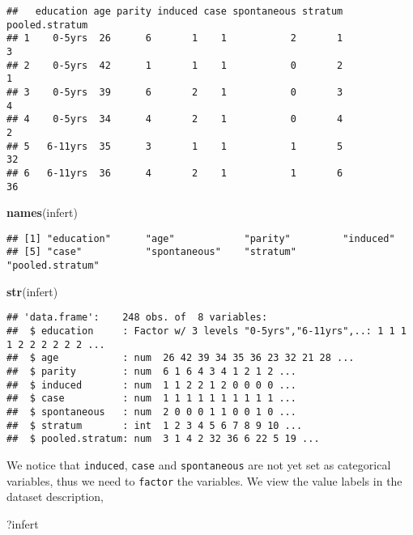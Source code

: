 \documentclass[]{book}
\newenvironment{Shaded}{\begin{snugshade}}{\end{snugshade}}
\newcommand{\KeywordTok}[1]{\textcolor[rgb]{0.13,0.29,0.53}{\textbf{{#1}}}}
\newcommand{\NormalTok}[1]{{#1}}
\theoremstyle{definition}
\theoremstyle{definition}
\theoremstyle{remark}
\begin{document}
\begin{verbatim}
##   education age parity induced case spontaneous stratum pooled.stratum
## 1    0-5yrs  26      6       1    1           2       1              3
## 2    0-5yrs  42      1       1    1           0       2              1
## 3    0-5yrs  39      6       2    1           0       3              4
## 4    0-5yrs  34      4       2    1           0       4              2
## 5   6-11yrs  35      3       1    1           1       5             32
## 6   6-11yrs  36      4       2    1           1       6             36
\end{verbatim}

\begin{Shaded}
\begin{Highlighting}[]
\KeywordTok{names}\NormalTok{(infert)}
\end{Highlighting}
\end{Shaded}

\begin{verbatim}
## [1] "education"      "age"            "parity"         "induced"       
## [5] "case"           "spontaneous"    "stratum"        "pooled.stratum"
\end{verbatim}

\begin{Shaded}
\begin{Highlighting}[]
\KeywordTok{str}\NormalTok{(infert)}
\end{Highlighting}
\end{Shaded}

\begin{verbatim}
## 'data.frame':    248 obs. of  8 variables:
##  $ education     : Factor w/ 3 levels "0-5yrs","6-11yrs",..: 1 1 1 1 2 2 2 2 2 2 ...
##  $ age           : num  26 42 39 34 35 36 23 32 21 28 ...
##  $ parity        : num  6 1 6 4 3 4 1 2 1 2 ...
##  $ induced       : num  1 1 2 2 1 2 0 0 0 0 ...
##  $ case          : num  1 1 1 1 1 1 1 1 1 1 ...
##  $ spontaneous   : num  2 0 0 0 1 1 0 0 1 0 ...
##  $ stratum       : int  1 2 3 4 5 6 7 8 9 10 ...
##  $ pooled.stratum: num  3 1 4 2 32 36 6 22 5 19 ...
\end{verbatim}

We notice that \texttt{induced}, \texttt{case} and \texttt{spontaneous}
are not yet set as categorical variables, thus we need to
\texttt{factor} the variables. We view the value labels in the dataset
description,

\begin{Shaded}
\begin{Highlighting}[]
\NormalTok{?infert}
\end{Highlighting}
\end{Shaded}
\end{document}
